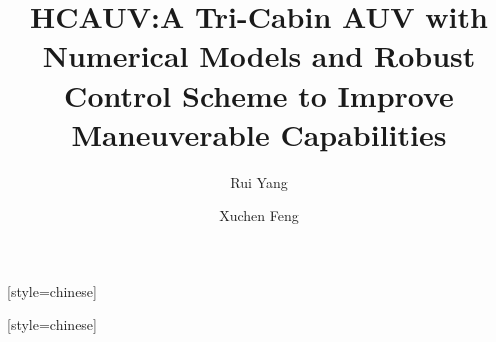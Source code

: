 \documentclass[a4paper,fleqn]{cas-dc}
\begin{document}
\let\WriteBookmarks\relax
\def\floatpagepagefraction{1}
\def\textpagefraction{.001}



\title [mode = title]{HCAUV:A Tri-Cabin AUV with Numerical Models and Robust Control Scheme to Improve Maneuverable Capabilities}  



%

\author[1]{Rui Yang}[style=chinese]
\cormark[cor1]






\author[1]{Xuchen Feng}[style=chinese]

\fnmark[1]




\end{document}

